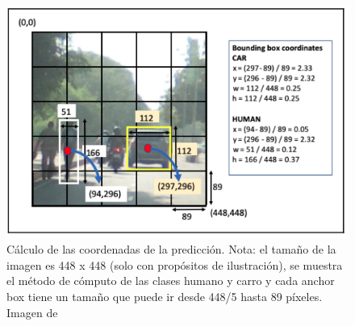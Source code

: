\begin{figure}[H]
    \centering
    \includegraphics{Recursos/grid_example.png}
    \caption{Cálculo de las coordenadas de la predicción. Nota: el tamaño de la imagen es 448 x 448 (solo con propósitos de ilustración), se muestra el método de cómputo de las clases humano y carro y cada anchor box tiene un tamaño que puede ir desde 448/5 hasta 89 píxeles. Imagen de \cite[p.~191]{Krishnendu}}
    \label{exampleYOLO}
\end{figure}
